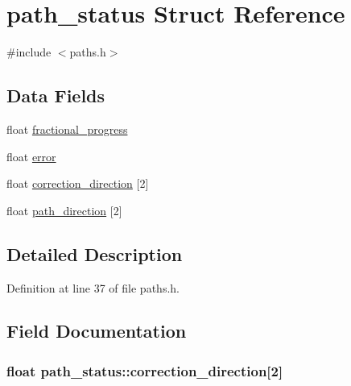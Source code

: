 \hypertarget{structpath__status}{\section{path\-\_\-status \-Struct \-Reference}
\label{structpath__status}
}


{\ttfamily \#include $<$paths.\-h$>$}

\subsection*{\-Data \-Fields}
\begin{DoxyCompactItemize}
\item 
float \hyperlink{structpath__status_a4ec0ce142eafe131f8e2d45d1771ebd3}{fractional\-\_\-progress}
\item 
float \hyperlink{structpath__status_a673ce13b12050e471c15f386e8193ac7}{error}
\item 
float \hyperlink{structpath__status_a0931fd2d5f90e4103b4096bae764ca86}{correction\-\_\-direction} \mbox{[}2\mbox{]}
\item 
float \hyperlink{structpath__status_ac36e4cfed92a1fe959ba8f45728e4779}{path\-\_\-direction} \mbox{[}2\mbox{]}
\end{DoxyCompactItemize}


\subsection{\-Detailed \-Description}


\-Definition at line 37 of file paths.\-h.



\subsection{\-Field \-Documentation}
\hypertarget{structpath__status_a0931fd2d5f90e4103b4096bae764ca86}{
\subsubsection[{correction\-\_\-direction}]{\setlength{\rightskip}{0pt plus 5cm}float {\bf path\-\_\-status\-::correction\-\_\-direction}\mbox{[}2\mbox{]}}}\label{structpath__status_a0931fd2d5f90e4103b4096bae764ca86}


